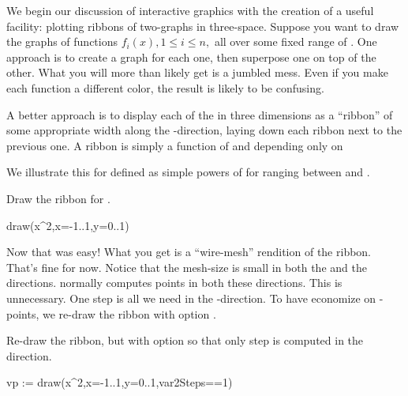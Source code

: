 %

We begin our discussion of interactive graphics with the creation
of a useful facility: plotting ribbons of two-graphs in
three-space.
Suppose you want to draw the \twodim{} graphs of 
functions
$f_i(x), 1 \leq i \leq n,$
all over some fixed range of .
One approach is to create a \twodim{} graph for each one, then
superpose one on top of the other.
What you will more than likely get is a jumbled mess.
Even if you make each function a different color, the result is
likely to be confusing.

A better approach is to display each of the  in three
dimensions as a ``ribbon'' of some appropriate width along the
-direction, laying down each  ribbon next to the
previous one.
A ribbon is simply a function of  and  depending
only on 

We illustrate this for  defined as simple powers of
 for  ranging between  and .

\begin{psXtc}
\begin{xtccomment}
Draw the ribbon for .
\end{xtccomment}
\begin{spadsrc}
draw(x^2,x=-1..1,y=0..1)
\end{spadsrc}
\end{psXtc}

Now that was easy!
What you get is a ``wire-mesh'' rendition of the ribbon.
That's fine for now.
Notice that the mesh-size is small in both the  and the
 directions.
\Language{} normally computes points in both these directions.
This is unnecessary.
One step is all we need in the -direction.
To have \Language{} economize on -points, we re-draw the
ribbon with option .

\begin{psXtc}
\begin{xtccomment}
Re-draw the ribbon, but with option 
so that only  step is computed in the
 direction.
\end{xtccomment}
\begin{spadsrc}
vp := draw(x^2,x=-1..1,y=0..1,var2Steps==1) 
\end{spadsrc}
\end{psXtc}

